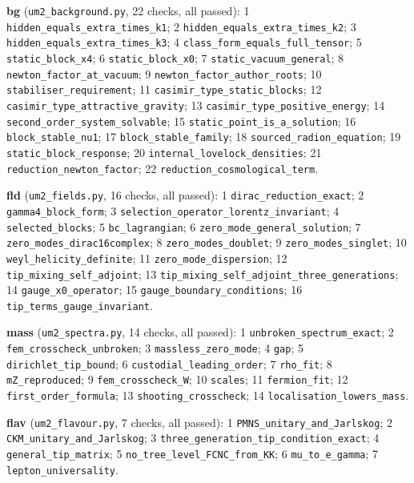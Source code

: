 \documentclass[
  10pt,
]{article}
\begin{document}
\textbf{bg} (\texttt{um2\_background.py}, 22 checks, all passed): 1
\texttt{hidden\_equals\_extra\_times\_k1}; 2
\texttt{hidden\_equals\_extra\_times\_k2}; 3
\texttt{hidden\_equals\_extra\_times\_k3}; 4
\texttt{class\_form\_equals\_full\_tensor}; 5
\texttt{static\_block\_x4}; 6 \texttt{static\_block\_x0}; 7
\texttt{static\_vacuum\_general}; 8 \texttt{newton\_factor\_at\_vacuum};
9 \texttt{newton\_factor\_author\_roots}; 10
\texttt{stabiliser\_requirement}; 11
\texttt{casimir\_type\_static\_blocks}; 12
\texttt{casimir\_type\_attractive\_gravity}; 13
\texttt{casimir\_type\_positive\_energy}; 14
\texttt{second\_order\_system\_solvable}; 15
\texttt{static\_point\_is\_a\_solution}; 16 \texttt{block\_stable\_nu1};
17 \texttt{block\_stable\_family}; 18
\texttt{sourced\_radion\_equation}; 19 \texttt{static\_block\_response};
20 \texttt{internal\_lovelock\_densities}; 21
\texttt{reduction\_newton\_factor}; 22
\texttt{reduction\_cosmological\_term}.

\textbf{fld} (\texttt{um2\_fields.py}, 16 checks, all passed): 1
\texttt{dirac\_reduction\_exact}; 2 \texttt{gamma4\_block\_form}; 3
\texttt{selection\_operator\_lorentz\_invariant}; 4
\texttt{selected\_blocks}; 5 \texttt{bc\_lagrangian}; 6
\texttt{zero\_mode\_general\_solution}; 7
\texttt{zero\_modes\_dirac16complex}; 8 \texttt{zero\_modes\_doublet}; 9
\texttt{zero\_modes\_singlet}; 10 \texttt{weyl\_helicity\_definite}; 11
\texttt{zero\_mode\_dispersion}; 12 \texttt{tip\_mixing\_self\_adjoint};
13 \texttt{tip\_mixing\_self\_adjoint\_three\_generations}; 14
\texttt{gauge\_x0\_operator}; 15 \texttt{gauge\_boundary\_conditions};
16 \texttt{tip\_terms\_gauge\_invariant}.

\textbf{mass} (\texttt{um2\_spectra.py}, 14 checks, all passed): 1
\texttt{unbroken\_spectrum\_exact}; 2
\texttt{fem\_crosscheck\_unbroken}; 3 \texttt{massless\_zero\_mode}; 4
\texttt{gap}; 5 \texttt{dirichlet\_tip\_bound}; 6
\texttt{custodial\_leading\_order}; 7 \texttt{rho\_fit}; 8
\texttt{mZ\_reproduced}; 9 \texttt{fem\_crosscheck\_W}; 10
\texttt{scales}; 11 \texttt{fermion\_fit}; 12
\texttt{first\_order\_formula}; 13 \texttt{shooting\_crosscheck}; 14
\texttt{localisation\_lowers\_mass}.

\textbf{flav} (\texttt{um2\_flavour.py}, 7 checks, all passed): 1
\texttt{PMNS\_unitary\_and\_Jarlskog}; 2
\texttt{CKM\_unitary\_and\_Jarlskog}; 3
\texttt{three\_generation\_tip\_condition\_exact}; 4
\texttt{general\_tip\_matrix}; 5
\texttt{no\_tree\_level\_FCNC\_from\_KK}; 6 \texttt{mu\_to\_e\_gamma}; 7
\texttt{lepton\_universality}.
\end{document}
